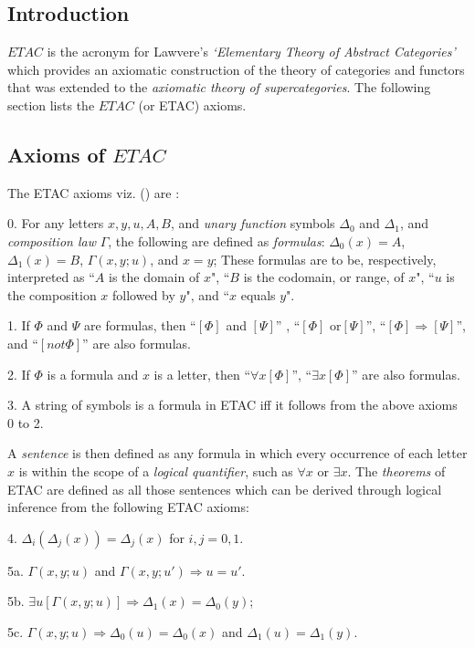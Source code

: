 \documentclass[12pt]{article}
\theoremstyle{plain}
\theoremstyle{definition}
\numberwithin{equation}{section}
\begin{document}
\subsection{Introduction}


 {\em $ETAC$} is the acronym for Lawvere's  {\em `Elementary Theory of Abstract Categories'}
which provides an axiomatic construction of the theory of categories and functors that was extended to 
the \emph{axiomatic theory of supercategories}. The following section lists the $ETAC$ (or ETAC) axioms.


\subsection{Axioms of $ETAC$}

 The ETAC axioms viz. (\cite{LW2}) are : 

0. For any letters $x, y, u, A, B$, and {\em unary function} symbols $\Delta_0$ and $\Delta_1$,
and \emph{composition law} $\Gamma$, the following are defined as \emph{formulas}: $\Delta_0 (x) = A$,
$\Delta_1 (x) = B$, $\Gamma (x,y;u)$, and $ x = y$; These formulas are to be, respectively, interpreted as
``$A$ is the domain of $x$", ``$B$ is the codomain, or range, of $x$", ``$u$ is the composition $x$ followed by $y$",
and ``$x$ equals $y$". 

1. If $\Phi$ and $\Psi$ are formulas, then ``$[\Phi]$ and $[\Psi]$'' , ``$[\Phi]$ or$[\Psi]$'', ``$[\Phi] \Rightarrow [\Psi]$'', and ``$[not \Phi]$''  are also formulas.

2. If $\Phi$ is a formula and $x$ is a letter, then ``$ \forall x[\Phi]$'', 
``$ \exists x[\Phi]$'' are also formulas.

3. A string of symbols is a formula in ETAC iff it follows from the above axioms 0 to 2.

A \emph{sentence} is then defined as any formula in which every occurrence of each letter $x$ is within the scope of a {\em logical quantifier}, such as $\forall x$  or $\exists x $.  The \emph{theorems} of ETAC are defined as all those sentences which can be derived through logical inference from the following ETAC axioms:

4. $\Delta_i(\Delta_j(x))=\Delta_j(x)$ for  $i,j = 0, 1$. 

5a. $\Gamma(x,y;u)$ and $\Gamma(x,y;u')\Rightarrow u = u'$.

5b. $ \exists u [\Gamma(x,y;u)] \Rightarrow \Delta_1(x) =  \Delta_0(y)$;

5c. $\Gamma(x,y;u) \Rightarrow \Delta_0(u) =  \Delta_0(x)$ and $\Delta_1(u) =  \Delta_1(y)$.
\end{document}

